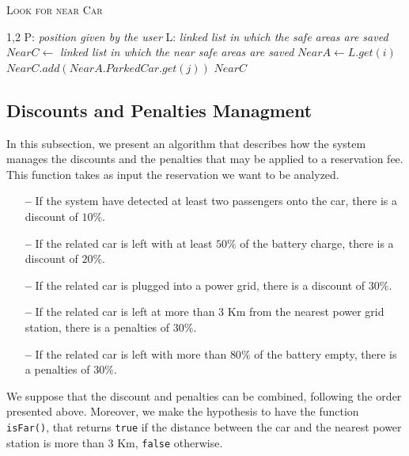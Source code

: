 \vspace{80pt}
\begin{algorithm}[h!tb]
\caption{\textsc{Look for near Car}}
\label{alg:near-car}
\begin{algorithmic}[1]
\begin{spacing}{1,2}
\State P: \textit{position given by the user }
\State L: \textit{linked list in which the safe areas are saved}
\State $NearC \leftarrow $ \textit{linked list in which the near safe areas are saved}
		\State $NearA \leftarrow L.get(i)$
				\State $NearC.add(NearA.ParkedCar.get(j))$
			\EndIf
		\EndFor
	\EndIf
\EndFor
\State\Return $NearC$
\EndFunction
\end{spacing}
\end{algorithmic}
\end{algorithm}

\clearpage

\subsection{Discounts and Penalties Managment} \label{subsec:discount}
In this subsection, we present an algorithm that describes how the system manages the discounts and the penalties that may be applied to a reservation fee. 
This function takes as input the reservation we want to be analyzed. 
\begin{enumerate}
\item[\textbf{--}]If the system have detected at least two passengers onto the car, there is a discount of $10\%$.
\item[\textbf{--}]If the related car is left with at least $50\%$ of the battery charge, there is a discount of $20\%$.
\item[\textbf{--}]If the related car is plugged into a power grid, there is a discount of $30\%$.
\item[\textbf{--}]If the related car is left at more than $3$ Km from the nearest power grid station, there is a penalties of $30\%$.
\item[\textbf{--}]If the related car is left with more than $80\%$ of the battery empty, there is a penalties of $30\%$.
\end{enumerate}
We suppose that the discount and penalties can be combined, following the order presented above.
Moreover, we make the hypothesis to have the function \texttt{isFar()}, that returns \texttt{true} if the distance between the car and the nearest power station is more than $3$ Km, \texttt{false} otherwise.
\newline

